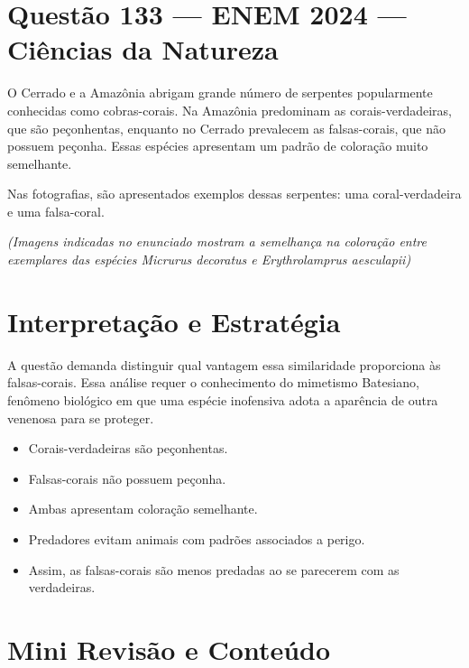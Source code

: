 \documentclass{article}
\begin{document}
\section*{Questão 133 — ENEM 2024 — Ciências da Natureza}

O Cerrado e a Amazônia abrigam grande número de serpentes popularmente conhecidas como cobras-corais. Na Amazônia predominam as corais-verdadeiras, que são peçonhentas, enquanto no Cerrado prevalecem as falsas-corais, que não possuem peçonha. Essas espécies apresentam um padrão de coloração muito semelhante.

Nas fotografias, são apresentados exemplos dessas serpentes: uma coral-verdadeira e uma falsa-coral.

\begin{center}
  \textit{(Imagens indicadas no enunciado mostram a semelhança na coloração entre exemplares das espécies \textit{Micrurus decoratus} e \textit{Erythrolamprus aesculapii})}
\end{center}

\section*{Interpretação e Estratégia}

A questão demanda distinguir qual vantagem essa similaridade proporciona às falsas-corais. Essa análise requer o conhecimento do mimetismo Batesiano, fenômeno biológico em que uma espécie inofensiva adota a aparência de outra venenosa para se proteger.

\begin{itemize}
  \item Corais-verdadeiras são peçonhentas.
  \item Falsas-corais não possuem peçonha.
  \item Ambas apresentam coloração semelhante.
  \item Predadores evitam animais com padrões associados a perigo.
  \item Assim, as falsas-corais são menos predadas ao se parecerem com as verdadeiras.
\end{itemize}

\section*{Mini Revisão e Conteúdo}
\end{document}
